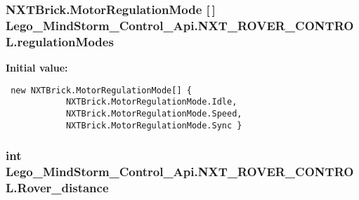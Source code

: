 \hypertarget{class_lego___mind_storm___control___api_1_1_n_x_t___r_o_v_e_r___c_o_n_t_r_o_l_4d5eaa2042fa1f8c7e4e3429d215ec5a}{
\subsubsection[{regulationModes}]{\setlength{\rightskip}{0pt plus 5cm}NXTBrick.MotorRegulationMode \mbox{[}$\,$\mbox{]} {\bf Lego\_\-MindStorm\_\-Control\_\-Api.NXT\_\-ROVER\_\-CONTROL.regulationModes}}}
\label{class_lego___mind_storm___control___api_1_1_n_x_t___r_o_v_e_r___c_o_n_t_r_o_l_4d5eaa2042fa1f8c7e4e3429d215ec5a}


\textbf{Initial value:}

\begin{Code}\begin{verbatim} new NXTBrick.MotorRegulationMode[] {
            NXTBrick.MotorRegulationMode.Idle,
            NXTBrick.MotorRegulationMode.Speed,
            NXTBrick.MotorRegulationMode.Sync }
\end{verbatim}
\end{Code}
\hypertarget{class_lego___mind_storm___control___api_1_1_n_x_t___r_o_v_e_r___c_o_n_t_r_o_l_94c73861419011bba4d378af6bcec076}{
\subsubsection[{Rover\_\-distance}]{\setlength{\rightskip}{0pt plus 5cm}int {\bf Lego\_\-MindStorm\_\-Control\_\-Api.NXT\_\-ROVER\_\-CONTROL.Rover\_\-distance}}}
\label{class_lego___mind_storm___control___api_1_1_n_x_t___r_o_v_e_r___c_o_n_t_r_o_l_94c73861419011bba4d378af6bcec076}


